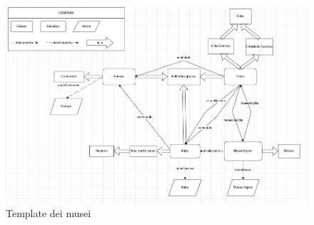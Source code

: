 \documentclass[12pt]{article}
\begin{document}
\begin{figure}[H]
   \includegraphics[scale=0.48]{fig/template Museo.png}
   \caption{Template dei musei}\label{fig:picture}
\end{figure}
\end{document}
